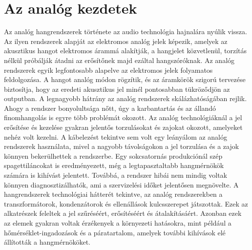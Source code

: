 \section{Az analóg kezdetek} %
Az analóg hangrendszerek története az audio technológia hajnalára nyúlik vissza. 
Az ilyen rendszerek alapját az elektromos analóg jelek képezik, amelyek az akusztikus hangot elektromos árammá alakítják,
a hangjelet közvetlenül, torzítás nélkül próbálják átadni az erősítőnek majd ezáltal hangszóróknak.
Az analóg rendszerek egyik legfontosabb alapelve az elektromos jelek folyamatos feldolgozása. 
A hangot analóg módon rögzítik, és az áramkörök szigorú tervezése biztosítja, hogy az eredeti akusztikus jel minél pontosabban tükröződjön az outputban.
A legnagyobb hátrány az analóg rendszerek skálázhatóságában rejlik. 
Ahogy a rendszer bonyolultsága nőtt, úgy a karbantartás és az állandó finomhangolás is egyre több problémát okozott. 
Az analóg technológiáknál a jel erősítése és kezelése gyakran jelentős torzulásokat és zajokat okozott, amelyeket nehéz volt kezelni.
A kábelezést tekintve sem volt egy leányálom az analóg rendszerek használata, mivel a nagyobb távolságokon a jel torzulása és a zajok könnyen bekerülhettek a rendszerbe.
Egy sokcsatornás produkciónál szép spagettiláncokat is eredményezett, még a legtapasztaltabb hangmérnökök számára is kihívást jelentett. 
Továbbá, a rendszer hibái nem mindig voltak könnyen diagnosztizálhatók, ami a szervizelési időket jelentősen megnövelte.
A hangrendszerek technológiai hátterét tekintve, az analóg rendszerekben a transzformátorok, kondenzátorok és ellenállások kulcsszerepet játszottak. 
Ezek az alkatrészek feleltek a jel szűréséért, erősítéséért és átalakításáért. 
Azonban ezek az elemek gyakran voltak érzékenyek a környezeti hatásokra, mint például a hőmérséklet-ingadozások és a páratartalom, 
amelyek további kihívások elé állították a hangmérnököket.
